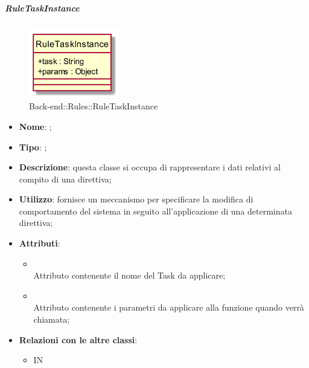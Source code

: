 \hypertarget{RuleTaskInstance_label}{\subparagraph{RuleTaskInstance}}
\begin{figure}[h]
	\centering
	\includegraphics[width=0.35\textwidth,height=\textheight,keepaspectratio]{images/ClassRuleTaskInstance.png}
	\caption{Back-end::Rules::RuleTaskInstance}
\end{figure}
\begin{itemize}
	\item \textbf{Nome}: ;
	\item \textbf{Tipo}: ;
	\item \textbf{Descrizione}: questa classe si occupa di rappresentare i dati relativi al compito di una direttiva;
	\item \textbf{Utilizzo}: fornisce un meccanismo per specificare la modifica di comportamento del sistema in seguito all'applicazione di una determinata direttiva;
	\item \textbf{Attributi}:
	\begin{itemize}
		\item[]  \\
		Attributo contenente il nome del Task da applicare;
		\item[]  \\
		Attributo contenente i parametri da applicare alla funzione quando verrà chiamata;
	\end{itemize}
	\item \textbf{Relazioni con le altre classi}:
	\begin{itemize}
		\item IN \hyperlink{Rule_label}{}
	\end{itemize}
\end{itemize}
\FloatBarrier

